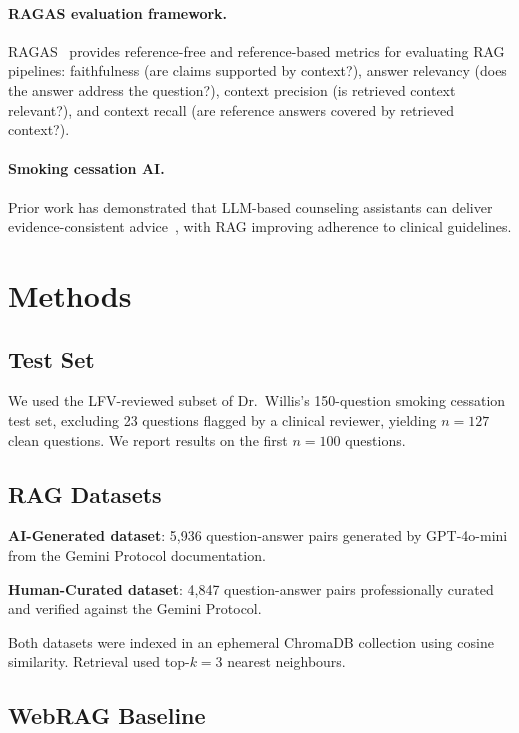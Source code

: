 \documentclass[11pt,a4paper]{article}
\begin{document}
\paragraph{RAGAS evaluation framework.}
RAGAS~\citep{es2023ragas} provides reference-free and reference-based metrics
for evaluating RAG pipelines: faithfulness (are claims supported by context?),
answer relevancy (does the answer address the question?), context precision
(is retrieved context relevant?), and context recall (are reference answers
covered by retrieved context?).

\paragraph{Smoking cessation AI.}
Prior work has demonstrated that LLM-based counseling assistants can
deliver evidence-consistent advice~\citep{eapen2023},
with RAG improving adherence to clinical guidelines.

\section{Methods}

\subsection{Test Set}

We used the LFV-reviewed subset of Dr.\ Willis's 150-question smoking cessation
test set, excluding 23 questions flagged by a clinical reviewer, yielding
$n = 127$ clean questions. We report results on the first $n = 100$ questions.

\subsection{RAG Datasets}

\textbf{AI-Generated dataset}: 5,936 question-answer pairs generated by
GPT-4o-mini from the Gemini Protocol documentation.

\textbf{Human-Curated dataset}: 4,847 question-answer pairs professionally
curated and verified against the Gemini Protocol.

Both datasets were indexed in an ephemeral ChromaDB collection using
cosine similarity. Retrieval used top-$k = 3$ nearest neighbours.

\subsection{WebRAG Baseline}
\end{document}
